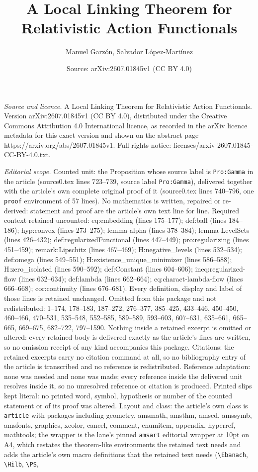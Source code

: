 \documentclass[10pt,a4paper]{amsart}
\title[A Local Linking Theorem for Relativistic Action Functionals]{A Local Linking Theorem for Relativistic Action Functionals}
\author{Manuel Garz\'on, Salvador L\'opez-Mart\'inez}
\date{Source: arXiv:2607.01845v1 (CC BY 4.0)}
\begin{document}
\maketitle

\noindent\emph{Source and licence.} A Local Linking Theorem for Relativistic Action Functionals. Version arXiv:2607.01845v1 (CC BY 4.0), distributed under the Creative Commons Attribution 4.0 International licence, as recorded in the arXiv licence metadata for this exact version and shown on the abstract page https://arxiv.org/abs/2607.01845v1. Full rights notice: licenses/arxiv-2607.01845-CC-BY-4.0.txt.\par\smallskip

\noindent\textit{Editorial scope.} Counted unit: the Proposition whose source label is \texttt{Pro:Gamma} in the article (source0.tex lines 723--739, source label \texttt{Pro:Gamma}), delivered together with the article's own complete original proof of it (source0.tex lines 740--796, one \texttt{proof} environment of 57 lines). No mathematics is written, repaired or re-derived: statement and proof are the article's own text line for line. Required context retained uncounted: eq:embedding (lines 175--177); def:ball (lines 184--186); hyp:convex (lines 273--275); lemma-alpha (lines 378--384); lemma-LevelSets (lines 426--432); def:regularizedFunctional (lines 447--449); pro:regularizing (lines 451--459); remark:Lipschitz (lines 467--469); H:negative\_levels (lines 532--534); def:omega (lines 549--551); H:existence\_unique\_minimizer (lines 586--588); H:zero\_isolated (lines 590--592); def:Constant (lines 604--606); ineq:regularized-flow (lines 632--634); def:lambda (lines 662--664); eq:charact-lambda-flow (lines 666--668); cor:continuity (lines 676--681). Every definition, display and label of those lines is retained unchanged. Omitted from this package and not redistributed: 1--174, 178--183, 187--272, 276--377, 385--425, 433--446, 450--450, 460--466, 470--531, 535--548, 552--585, 589--589, 593--603, 607--631, 635--661, 665--665, 669--675, 682--722, 797--1590. Nothing inside a retained excerpt is omitted or altered: every retained body is delivered exactly as the article's lines are written, so no omission receipt of any kind accompanies this package. Citations: the retained excerpts carry no citation command at all, so no bibliography entry of the article is transcribed and no reference is redistributed. Reference adaptation: none was needed and none was made; every reference inside the delivered unit resolves inside it, so no unresolved reference or citation is produced. Printed slips kept literal: no printed word, symbol, hypothesis or number of the counted statement or of its proof was altered. Layout and class: the article's own class is \texttt{article} with packages including geometry, amsmath, amsthm, amscd, amssymb, amsfonts, graphics, xcolor, cancel, comment, enumitem, appendix, hyperref, mathtools; the wrapper is the lane's pinned \texttt{amsart} editorial wrapper at 10pt on A4, which restates the theorem-like environments the retained text needs and adds the article's own macro definitions that the retained text needs (\texttt{\textbackslash Ebanach}, \texttt{\textbackslash Hilb}, \texttt{\textbackslash PS}, 
\end{document}
